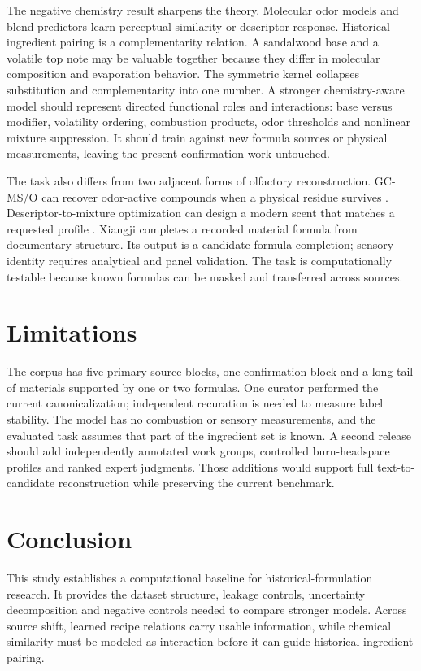 \documentclass[11pt]{article}
\begin{document}
The negative chemistry result sharpens the theory. Molecular odor models \cite{ref4,ref5,ref6,ref7,ref8} and blend predictors \cite{ref9} learn perceptual similarity or descriptor response. Historical ingredient pairing is a complementarity relation. A sandalwood base and a volatile top note may be valuable together because they differ in molecular composition and evaporation behavior. The symmetric kernel collapses substitution and complementarity into one number. A stronger chemistry-aware model should represent directed functional roles and interactions: base versus modifier, volatility ordering, combustion products, odor thresholds and nonlinear mixture suppression. It should train against new formula sources or physical measurements, leaving the present confirmation work untouched.

The task also differs from two adjacent forms of olfactory reconstruction. GC-MS/O can recover odor-active compounds when a physical residue survives \cite{ref3}. Descriptor-to-mixture optimization can design a modern scent that matches a requested profile \cite{ref10}. Xiangji completes a recorded material formula from documentary structure. Its output is a candidate formula completion; sensory identity requires analytical and panel validation. The task is computationally testable because known formulas can be masked and transferred across sources.

\section{Limitations}

The corpus has five primary source blocks, one confirmation block and a long tail of materials supported by one or two formulas. One curator performed the current canonicalization; independent recuration is needed to measure label stability. The model has no combustion or sensory measurements, and the evaluated task assumes that part of the ingredient set is known. A second release should add independently annotated work groups, controlled burn-headspace profiles and ranked expert judgments. Those additions would support full text-to-candidate reconstruction while preserving the current benchmark.

\section{Conclusion}

This study establishes a computational baseline for historical-formulation research. It provides the dataset structure, leakage controls, uncertainty decomposition and negative controls needed to compare stronger models. Across source shift, learned recipe relations carry usable information, while chemical similarity must be modeled as interaction before it can guide historical ingredient pairing.
\end{document}
